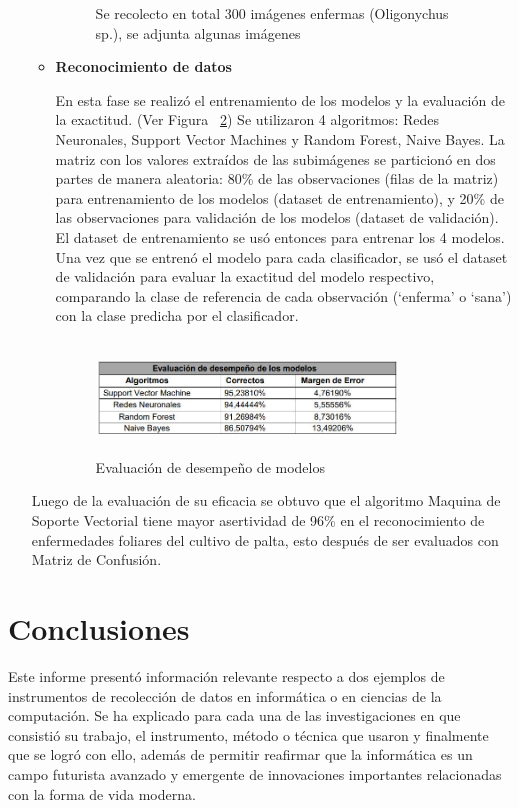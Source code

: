 \documentclass[10pt,journal]{IEEEtran}
\begin{document}
\begin{enumerate}
\begin{itemize}
\begin{figure}[H]
\begin{center}
            \caption{Se recolecto en total 300 imágenes enfermas (Oligonychus sp.), se adjunta algunas imágenes}
            \label{f4} 
            \end{center}
    \end{figure}
    \item {\textbf{Reconocimiento de datos}}\par
    En esta fase se realizó el entrenamiento de los modelos y la evaluación de la exactitud. (Ver Figura ~\ref{f5}) Se utilizaron 4 algoritmos: Redes Neuronales, Support Vector Machines y Random Forest, Naive Bayes. La matriz con los valores extraídos de las subimágenes se particionó en dos partes de manera aleatoria: 80\% de las observaciones (filas de la matriz) para entrenamiento de los modelos (dataset de entrenamiento), y 20\% de las observaciones para validación de los modelos (dataset de validación). El dataset de entrenamiento se usó entonces para entrenar los 4 modelos. Una vez que se entrenó el modelo para cada clasificador, se usó el dataset de validación para evaluar la exactitud del modelo respectivo, comparando la clase de referencia de cada observación (‘enferma’ o ‘sana’) con la clase predicha por el clasificador.
    \begin{figure}[H]
        \begin{center}
            \includegraphics[width=8cm, height=3cm]{figuras/5.JPG}
            \caption{Evaluación de desempeño de modelos}
            \label{f5} 
            \end{center}
    \end{figure}
    
\end{itemize}

Luego de la evaluación de su eficacia se obtuvo que el algoritmo Maquina de Soporte Vectorial tiene mayor asertividad de 96\% en el reconocimiento de enfermedades foliares del cultivo de palta, esto después de ser evaluados con Matriz de Confusión.
\end{enumerate}
\section{\textbf{Conclusiones}}
Este informe presentó información relevante respecto a dos ejemplos de instrumentos de recolección de datos en informática o en ciencias de la computación. Se ha explicado para cada una de las investigaciones en que consistió su trabajo, el instrumento, método o técnica que usaron y finalmente que se logró con ello, además de permitir reafirmar que la informática es un campo futurista avanzado y emergente de innovaciones importantes relacionadas con la forma de vida moderna. 
\medskip

\end{document}
